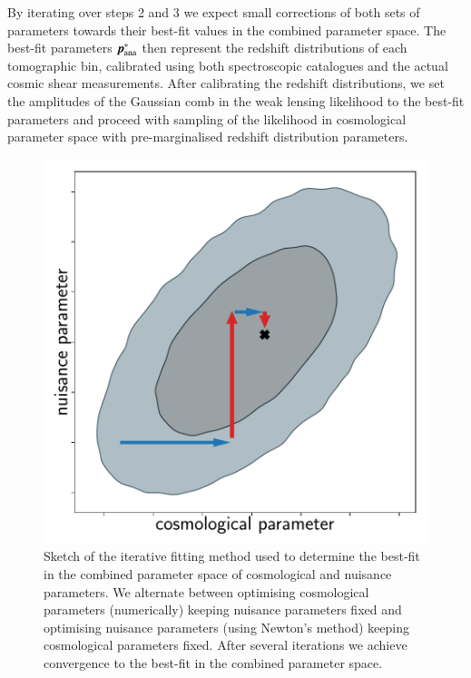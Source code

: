 \documentclass{aa}
\begin{document}
By iterating over steps 2 and 3 we expect small corrections of both sets of parameters towards their best-fit values in the combined parameter space. The best-fit parameters $\boldsymbol{p}^*_{\rm ana}$ then represent the redshift distributions of each tomographic bin, calibrated using both spectroscopic catalogues and the actual cosmic shear measurements. After calibrating the redshift distributions, we set the amplitudes of the Gaussian comb in the weak lensing likelihood to the best-fit parameters and proceed with sampling of the likelihood in cosmological parameter space with pre-marginalised redshift distribution parameters.
\begin{figure}
\centering
\includegraphics[width=\linewidth]{plots/iterative.pdf}
\caption{Sketch of the iterative fitting method used to determine the best-fit in the combined parameter space of cosmological and nuisance parameters. We alternate between optimising cosmological parameters (numerically) keeping nuisance parameters fixed and optimising nuisance parameters (using Newton's method) keeping cosmological parameters fixed. After several iterations we achieve convergence to the best-fit in the combined parameter space.}
\label{fig:iterative_calibration}
\end{figure}
\end{document}
